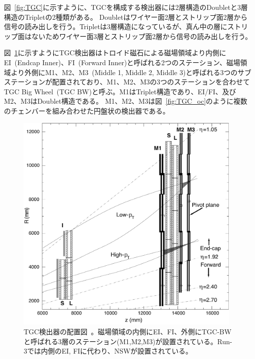 図~\ref{fig:TGC}に示すように、TGCを構成する検出器には2層構造のDoubletと3層構造のTripletの2種類がある。
Doubletはワイヤー面2層とストリップ面2層から信号の読み出しを行う。Tripletは3層構造になっているが、真ん中の層にストリップ面はないためワイヤー面3層とストリップ面2層から信号の読み出しを行う。

図~\ref{fig:TGC_st}に示すようにTGC検出器はトロイド磁石による磁場領域より内側にEI~(Endcap Inner)、FI~(Forward Inner)と呼ばれる2つのステーション、磁場領域より外側にM1、M2、M3~(Middle 1, Middle 2, Middle 3)と呼ばれる3つのサブステーションが配置されており、M1、M2、M3の3つのステーションを合わせてTGC Big Wheel~(TGC BW)と呼ぶ。M1はTriplet構造であり、EI/FI、及びM2、M3はDoublet構造である。
M1、M2、M3は図~\ref{fig:TGC_oc}のように複数のチェンバーを組み合わせた円盤状の検出器である。
\begin{figure}[tb]
  \centering
  \includegraphics[clip, width=11cm]{fig/2/l1mue-schema.pdf}
  \caption{TGC検出器の配置図~\cite{Aad:1129811}。磁場領域の内側にEI、FI、外側にTGC-BWと呼ばれる3層のステーション(M1,M2,M3)が設置されている。Run-3では内側のEI,
  FIに代わり、NSWが設置されている。}
  \label{fig:TGC_st}
\end{figure}


